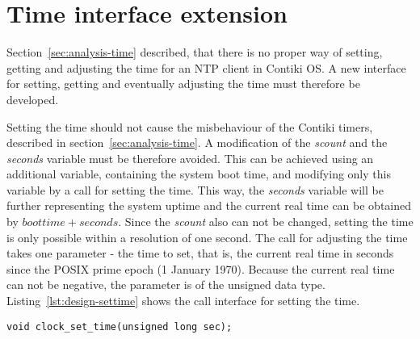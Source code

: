
\section{Time interface extension}\label{sec:design-interface}
Section~\ref{sec:analysis-time} described, that there is no proper
way of setting, getting and adjusting the time for an NTP client in Contiki OS.
A new interface for setting, getting and eventually adjusting the time
must therefore be developed.

Setting the time should not cause the misbehaviour of the Contiki timers,
described in section~\ref{sec:analysis-time}.
A modification of the {\it{scount}} and the {\it{seconds}} variable must be therefore avoided.
This can be achieved using an additional variable, containing the system boot time,
and modifying only this variable by a call for setting the time.
This way, the {\it{seconds}} variable will be further representing the system uptime
and the current real time can be obtained by $boottime + seconds$.
Since the {\it{scount}} also can not be changed, setting the time is only possible
within a resolution of one second.
The call for adjusting the time takes one parameter - the time to set, that is, the current real time in
seconds since the POSIX prime epoch (1 January 1970).
Because the current real time can not be negative, the parameter is of the unsigned data type.
Listing~\ref{lst:design-settime} shows the call interface for setting the time.
\begin{lstlisting}[caption={Call interface for setting the time},label={lst:design-settime}]
void clock_set_time(unsigned long sec);
\end{lstlisting}

